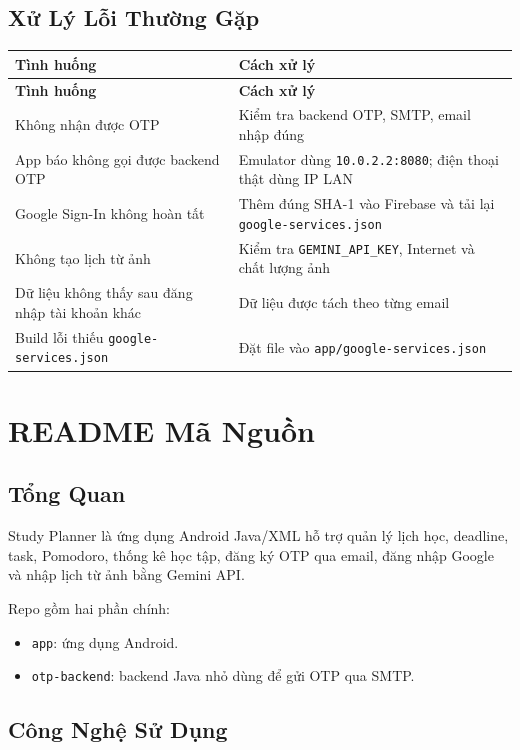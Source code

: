 \documentclass[12pt,a4paper]{report}
\begin{document}
\section{Xử Lý Lỗi Thường Gặp}

\begin{longtable}{|>{\raggedright\arraybackslash}p{}|>{\raggedright\arraybackslash}p{}|}
\hline
\textbf{Tình huống} & \textbf{Cách xử lý} \\ \hline
\endfirsthead
\hline
\textbf{Tình huống} & \textbf{Cách xử lý} \\ \hline
\endhead
Không nhận được OTP & Kiểm tra backend OTP, SMTP, email nhập đúng \\ \hline
App báo không gọi được backend OTP & Emulator dùng \texttt{10.0.2.2:8080}; điện thoại thật dùng IP LAN \\ \hline
Google Sign-In không hoàn tất & Thêm đúng SHA-1 vào Firebase và tải lại \texttt{google-services.json} \\ \hline
Không tạo lịch từ ảnh & Kiểm tra \texttt{GEMINI\_API\_KEY}, Internet và chất lượng ảnh \\ \hline
Dữ liệu không thấy sau đăng nhập tài khoản khác & Dữ liệu được tách theo từng email \\ \hline
Build lỗi thiếu \texttt{google-services.json} & Đặt file vào \texttt{app/google-services.json} \\ \hline
\end{longtable}
\clearpage
\chapter{README Mã Nguồn}

\section{Tổng Quan}

Study Planner là ứng dụng Android Java/XML hỗ trợ quản lý lịch học, deadline, task, Pomodoro, thống kê học tập, đăng ký OTP qua email, đăng nhập Google và nhập lịch từ ảnh bằng Gemini API.

Repo gồm hai phần chính:

\begin{itemize}
\item \texttt{app}: ứng dụng Android.
\item \texttt{otp-backend}: backend Java nhỏ dùng để gửi OTP qua SMTP.
\end{itemize}

\section{Công Nghệ Sử Dụng}
\end{document}
